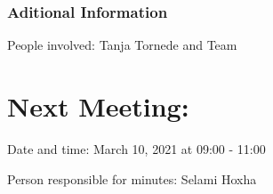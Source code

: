 \documentclass[11pt]{meetingmins} %
\begin{document}
    \subsubsection{Aditional Information}
    	\begin{hiddensubitems}
  		 	\item People involved: Tanja Tornede and Team
  		\end{hiddensubitems}    
    
\section{Next Meeting:}
    \begin{hiddensubitems}
        \item Date and time: March 10, 2021 at 09:00 - 11:00
        \item Person responsible for minutes: Selami Hoxha
    \end{hiddensubitems}
\end{document}
